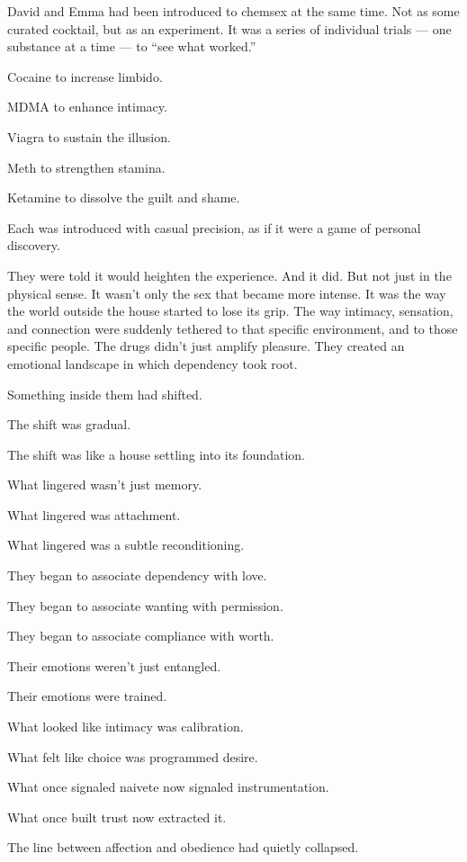 \medskip

David and Emma had been introduced to chemsex at the same time. Not as some curated cocktail, but as an experiment. 
It was a series of individual trials --- one substance at a time --- to ``see what worked.'' 

Cocaine to increase limbido. 

MDMA to enhance intimacy. 

Viagra to sustain the illusion. 

Meth to strengthen stamina. 

Ketamine to dissolve the guilt and shame. 

Each was introduced with casual precision, as if it were a game of personal discovery.

They were told it would heighten the experience. And it did. But not just in the physical sense. It wasn’t only 
the sex that became more intense. It was the way the world outside the house started to lose its grip. 
The way intimacy, sensation, and connection were suddenly tethered to that specific environment, and to those 
specific people. The drugs didn’t just amplify pleasure. They created an emotional landscape in which 
dependency took root.

Something inside them had shifted. 

The shift was gradual. 

The shift was like a house settling into its foundation. 

What lingered wasn’t just memory. 

What lingered was attachment. 

What lingered was a subtle reconditioning. 

They began to associate dependency with love. 

They began to associate wanting with permission.

They began to associate compliance with worth.

Their emotions weren’t just entangled. 

Their emotions were trained.

What looked like intimacy was calibration.

What felt like choice was programmed desire.

What once signaled naivete now signaled instrumentation.

What once built trust now extracted it.

The line between affection and obedience had quietly collapsed.

